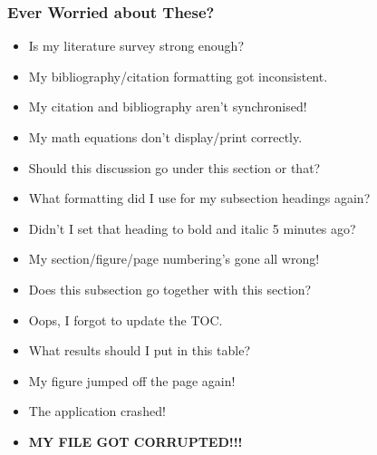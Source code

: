 \begin{frame}
\frametitle{Ever Worried about These?}
\begin{itemize}
\item<2-16> Is my literature survey strong enough?
\item<3-15,17|alert@17|trans:alert@1|handout:alert@1> My bibliography/citation formatting got inconsistent.
\item<4-15,17|alert@17|trans:alert@1|handout:alert@1> My citation and bibliography aren't synchronised!
\item<5-15,17|alert@17|trans:alert@1|handout:alert@1> My math equations don't display/print correctly.
\item<6-16> Should this discussion go under this section or that?
\item<7-15,17|alert@17|trans:alert@1|handout:alert@1> What formatting did I use for my subsection headings again?
\item<8-15,17|alert@17|trans:alert@1|handout:alert@1> Didn't I set that heading to bold and italic 5 minutes ago?
\item<9-15,17|alert@17|trans:alert@1|handout:alert@1> My section/figure/page numbering's gone all wrong!
\item<10-16> Does this subsection go together with this section?
\item<11-15,17|alert@17|trans:alert@1|handout:alert@1> Oops, I forgot to update the TOC.
\item<12-16> What results should I put in this table?
\item<13-15,17|alert@17|trans:alert@1|handout:alert@1> My figure jumped off the page again!
\item<14-15,17|alert@17|trans:alert@1|handout:alert@1> The application crashed!
\item<15-15,17|alert@17|trans:alert@1|handout:alert@1> \textbf{MY FILE GOT CORRUPTED!!!}
\end{itemize}
\end{frame}


